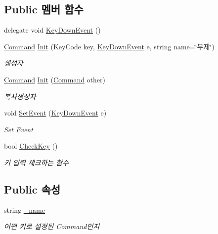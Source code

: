 \subsection*{Public 멤버 함수}
\begin{DoxyCompactItemize}
\item 
delegate void \mbox{\hyperlink{class_command_acc714b5e0de57b7f24b2619fff860b9d}{Key\+Down\+Event}} ()
\item 
\mbox{\hyperlink{class_command}{Command}} \mbox{\hyperlink{class_command_afc8d0350d5935d74a3685f427173d62e}{Init}} (Key\+Code key, \mbox{\hyperlink{class_command_acc714b5e0de57b7f24b2619fff860b9d}{Key\+Down\+Event}} e, string name=\char`\"{}무제\char`\"{})
\begin{DoxyCompactList}\small\item\em 생성자 \end{DoxyCompactList}\item 
\mbox{\hyperlink{class_command}{Command}} \mbox{\hyperlink{class_command_a4f0000c27196a2cb5f5c3a38ce0ff952}{Init}} (\mbox{\hyperlink{class_command}{Command}} other)
\begin{DoxyCompactList}\small\item\em 복사생성자 \end{DoxyCompactList}\item 
void \mbox{\hyperlink{class_command_a306ef92268d70413bf59adaa36a35b07}{Set\+Event}} (\mbox{\hyperlink{class_command_acc714b5e0de57b7f24b2619fff860b9d}{Key\+Down\+Event}} e)
\begin{DoxyCompactList}\small\item\em Set Event \end{DoxyCompactList}\item 
bool \mbox{\hyperlink{class_command_a1f9dcd759b1d51871f8a6efd30c3a721}{Check\+Key}} ()
\begin{DoxyCompactList}\small\item\em 키 입력 체크하는 함수 \end{DoxyCompactList}\end{DoxyCompactItemize}
\subsection*{Public 속성}
\begin{DoxyCompactItemize}
\item 
string \mbox{\hyperlink{class_command_a18a8a95d7f2c65bfa786fb525c42d0c4}{\+\_\+name}}
\begin{DoxyCompactList}\small\item\em 어떤 키로 설정된 Command인지 \end{DoxyCompactList}\end{DoxyCompactItemize}
